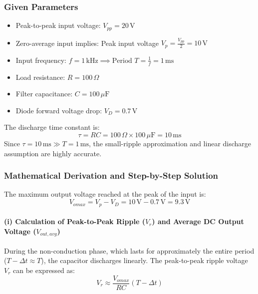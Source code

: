 \documentclass[12pt,a3paper]{article}
\begin{document}
\begin{enumerate}
\begin{tcolorbox}[enhanced,breakable,ansbox,colback=cA!4,colframe=cA,boxrule=0.8pt,arc=5pt,title={\textbf{Answer}},fonttitle=\bfseries\color{white},colbacktitle=cA]
\subsubsection*{Given Parameters}
\begin{itemize}
    \item Peak-to-peak input voltage: $V_{pp} = 20\,\text{V}$
    \item Zero-average input implies: Peak input voltage $V_p = \frac{V_{pp}}{2} = 10\,\text{V}$
    \item Input frequency: $f = 1\,\text{kHz} \implies \text{Period } T = \frac{1}{f} = 1\,\text{ms}$
    \item Load resistance: $R = 100\,\Omega$
    \item Filter capacitance: $C = 100\,\mu\text{F}$
    \item Diode forward voltage drop: $V_D = 0.7\,\text{V}$
\end{itemize}

The discharge time constant is:
\begin{equation*}
    \tau = RC = 100\,\Omega \times 100\,\mu\text{F} = 10\,\text{ms}
\end{equation*}
Since $\tau = 10\,\text{ms} \gg T = 1\,\text{ms}$, the small-ripple approximation and linear discharge assumption are highly accurate.

\vspace{0.5em}
\hrulefill
\vspace{0.5em}

\subsubsection*{Mathematical Derivation and Step-by-Step Solution}

The maximum output voltage reached at the peak of the input is:
\begin{equation*}
    V_{omax} = V_p - V_D = 10\,\text{V} - 0.7\,\text{V} = 9.3\,\text{V}
\end{equation*}

\paragraph{(i) Calculation of Peak-to-Peak Ripple ($V_r$) and Average DC Output Voltage ($V_{out,avg}$)}
During the non-conduction phase, which lasts for approximately the entire period ($T - \Delta t \approx T$), the capacitor discharges linearly. The peak-to-peak ripple voltage $V_r$ can be expressed as:
\begin{equation}
    V_r \approx \frac{V_{omax}}{RC}(T - \Delta t)
\end{equation}


\end{tcolorbox}
\end{enumerate}
\end{document}
